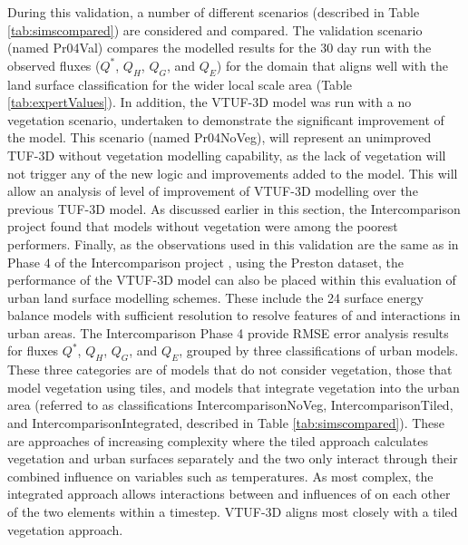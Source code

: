 \documentclass[final,3p,times,authoryear]{elsarticle}
\begin{document}
During this validation, a number of different scenarios (described in Table \ref{tab:simscompared}) are considered and compared. The validation scenario (named Pr04Val) compares the modelled results for the 30 day run with the observed fluxes ($Q^{*}$, $Q_{H}$, $Q_{G}$, and $Q_{E}$) for the domain that aligns well with the land surface classification for the wider local scale area (Table \ref{tab:expertValues}). In addition, the VTUF-3D model was run with a no vegetation scenario, undertaken to demonstrate the significant improvement of the model. This scenario (named Pr04NoVeg), will represent an unimproved TUF-3D without vegetation modelling capability, as the lack of vegetation will not trigger any of the new logic and improvements added to the model. This will allow an analysis of level of improvement of VTUF-3D modelling over the previous TUF-3D model. As discussed earlier in this section, the Intercomparison project \citep{Grimmond2011} found that models without vegetation were among the poorest performers. Finally, as the observations used in this validation are the same as in Phase 4 of the Intercomparison project \citep{Best2012}, using the \cite{Coutts2007} Preston dataset, the performance of the VTUF-3D model can also be placed within this evaluation of urban land surface modelling schemes. These include the 24 surface energy balance models with sufficient resolution to resolve features of and interactions in urban areas. The Intercomparison Phase 4 provide RMSE error analysis results for fluxes $Q^{*}$, $Q_{H}$, $Q_{G}$, and $Q_{E}$, grouped by three classifications of urban models. These three categories are of models that do not consider vegetation, those that model vegetation using tiles, and models that integrate vegetation into the urban area (referred to as classifications IntercomparisonNoVeg, IntercomparisonTiled, and IntercomparisonIntegrated, described in Table \ref{tab:simscompared}). These are approaches of increasing complexity where the tiled approach calculates vegetation and urban surfaces separately and the two only interact through their combined influence on variables such as temperatures. As most complex, the integrated approach allows interactions between and influences of on each other of the two elements within a timestep. VTUF-3D aligns most closely with a tiled vegetation approach.
\end{document}
